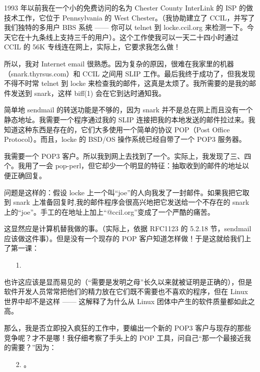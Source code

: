 1993 年以前我在一个小的免费访问的名为 Chester County InterLink 的 ISP 的做技术工作，它位于 Pennsylvania 的 West Chester。（我协助建立了 CCIL，并写了我们独特的多用户 BBS 系统 —— 你可以 telnet 到 locke.ccil.org 来检测一下。今天它在十九条线上支持三千的用户）。这个工作使我可以一天二十四小时通过 CCIL 的 56K 专线连在网上，实际上，它要求我怎么做！


所以，我对 Internet email 很熟悉。因为复杂的原因，很难在我家里的机器（snark.thyrsus.com）和 CCIL 之间用 SLIP 工作。最后我终于成功了，但我发现不得不时常 telnet 到 locke 来检查我的邮件，这真是太烦了。我所需要的是我的邮件发送到 snark，这样 biff(1) 会在它到达时通知我。


简单地 sendmail 的转送功能是不够的，因为 snark 并不是总在网上而且没有一个静态地址。我需要一个程序通过我的 SLIP 连接把我的本地发送的邮件拉过来。我知道这种东西是存在的，它们大多使用一个简单的协议 POP（Post Office Protocol）。而且，locke 的 BSD/OS 操作系统已经自带了一个 POP3 服务器。


我需要一个 POP3 客户。所以我到网上去找到了一个。实际上，我发现了三、四个。我用了一会 pop-perl，但它却少一个明显的特征：抽取收到的邮件的地址以便正确回复。


问题是这样的：假设 locke 上一个叫“joe”的人向我发了一封邮件。如果我把它取到 snark 上准备回复时,我的邮件程序会很高兴地把它发送给一个不存在的 snark 上的“joe”。手工的在地址上加上“@ccil.org”变成了一个严酷的痛苦。


这显然应是计算机替我做的事。（实际上，依据 RFC1123 的 5.2.18 节，sendmail 应该做这件事）。但是没有一个现存的 POP 客户知道怎样做！于是这就给我们上了第一课：


\begin{enumerate}
\item[1.] 
\end{enumerate}

也许这应该是显而易见的（“需要是发明之母”长久以来就被证明是正确的），但是软件开发人员常常把他们的精力放在它们既不需要也不喜欢的程序，但在 Linux 世界中却不是这样 —— 这解释了为什么从 Linux 团体中产生的软件质量都如此之高。


那么，我是否立即投入疯狂的工作中，要编出一个新的 POP3 客户与现存的那些竞争呢？才不是哪！我仔细考察了手头上的 POP 工具，问自己“那一个最接近我的需要？”因为：

\begin{enumerate}
\item[2.] 。
\end{enumerate}


